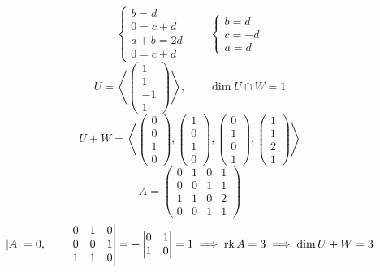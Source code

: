 $$
\begin{cases}
	b = d \\
    0 = c + d \\
    a + b = 2d \\
    0 = c + d
\end{cases} \qquad
\begin{cases}
	b = d \\
    c = -d \\
    a = d
\end{cases} $$
$$ U = \left\langle
\begin{pmatrix}
	1 \\
    1 \\
    -1 \\
    1
\end{pmatrix} \right\rangle, \qquad \dim U \cap W = 1 $$
$$ U + W = \left\langle
\begin{pmatrix}
	0 \\
    0 \\
    1 \\
    0
\end{pmatrix},
\begin{pmatrix}
	1 \\
    0 \\
    1 \\
    0
\end{pmatrix},
\begin{pmatrix}
	0 \\
    1 \\
    0 \\
    1
\end{pmatrix},
\begin{pmatrix}
	1 \\
    1 \\
    2 \\
    1
\end{pmatrix} \right\rangle $$
$$ A =
\begin{pmatrix}
	0 & 1 & 0 & 1 \\
    0 & 0 & 1 & 1 \\
    1 & 1 & 0 & 2 \\
    0 & 0 & 1 & 1
\end{pmatrix} $$
$$ |A| = 0, \qquad
\begin{vmatrix}
	0 & 1 & 0 \\
    0 & 0 & 1 \\
    1 & 1 & 0
\end{vmatrix} = -
\begin{vmatrix}
	0 & 1 \\
    1 & 0
\end{vmatrix} = 1 \implies \operatorname{rk} A = 3 \implies \dim U + W = 3 $$
